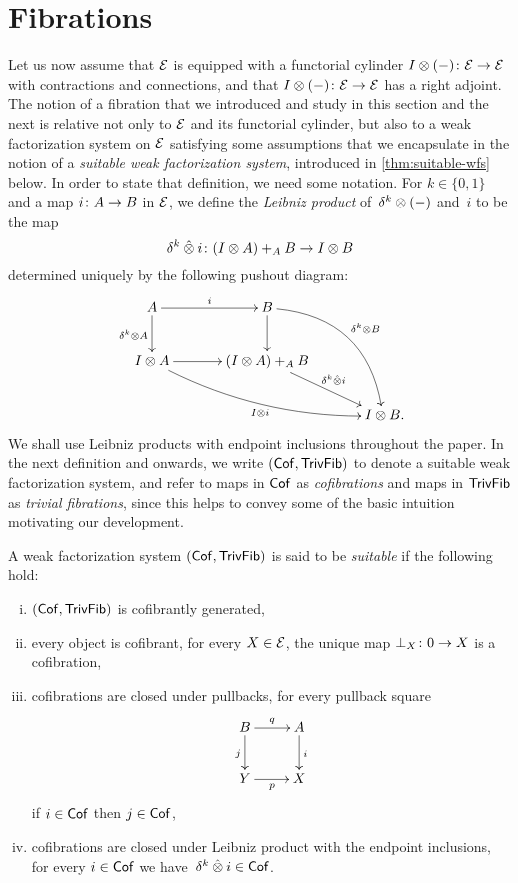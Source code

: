 \documentclass[reqno,10pt,a4paper,oneside,draft]{amsart}
\begin{document}
\section{Fibrations} 
\label{sec:fib}

Let us now assume that $\catE$ is equipped with a functorial cylinder $\interval\otimes (-) \co \catE \to \catE$ with contractions and connections, and that 
$\interval\otimes (-) \co \catE \to \catE$ has a right adjoint. 
The notion of a fibration that we introduced and study in this section and the next is relative not only to $\cal{E}$ and its functorial cylinder,
but also to a weak factorization system on $\cal{E}$ satisfying some assumptions that we encapsulate in the notion of a \emph{suitable
weak factorization system}, introduced in \cref{thm:suitable-wfs} below. In order to state that definition, we need some notation.  
For $k \in \{ 0, 1\}$ and a map $i \co A \to B$ in $\catE$, we define the \emph{Leibniz product} of~$\kcyl \otimes (-)$ and~$i$ to be the map 
\[
\kcyl \hatotimes i \co (\interval \otimes A) +_A B \to \interval \otimes B
\] 
determined uniquely by the following pushout diagram:
\begin{gather*}
\xymatrix@C=1.2cm{
  A
  \ar[r]^{i}
  \ar[d]_{\kcyl \otimes A}
&
  B
  \ar@/^2pc/[ddr]^{\kcyl \otimes B}
  \ar[d]
&\\
  \interval \otimes A
  \ar@/_1pc/[drr]_{\interval \otimes i}
  \ar[r]
&
  (\interval \otimes A) +_A B
  \ar[dr]^-{\delta^k \hatotimes i}
&\\&&
  \interval \otimes B
\rlap{.}}
\end{gather*}
We shall use Leibniz products with endpoint inclusions throughout the paper. In the next definition and onwards, we write
$(\Cof, \TrivFib)$ to denote a suitable weak factorization system, and refer to maps in $\Cof$ as \emph{cofibrations} and maps in 
$\TrivFib$ as \emph{trivial fibrations}, since this helps to convey some of the basic intuition motivating our development. 

\begin{definition} \label{thm:suitable-wfs} A weak factorization system $(\Cof, \TrivFib)$ is said to be \emph{suitable} if the following hold:
\begin{enumerate}[(i)]
 \item $(\Cof, \TrivFib)$  is cofibrantly generated,
\item every object is cofibrant, \ie for every $X \in \cal{E}$, the unique map $\bot_X \co 0 \to X$ is a cofibration, 
 \item cofibrations are closed under pullbacks, \ie for every pullback square
\[
\xymatrix{
B \ar[d]_j \ar[r]^q & A \ar[d]^i \\
Y \ar[r]_p & X }
\]
if $i \in \Cof$ then $j \in \Cof$, 
\item cofibrations are closed under Leibniz product with the endpoint inclusions, \ie for every $i \in \Cof$ we 
have~$\kcyl \hatotimes i \in \Cof$.
\end{enumerate}
\end{definition}
\end{document}
